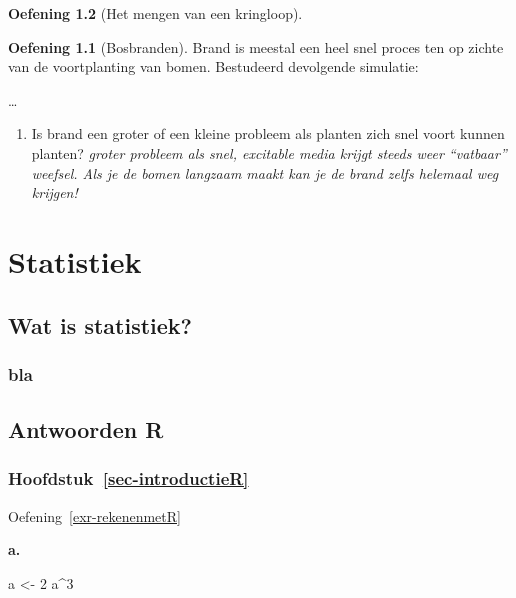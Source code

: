 \documentclass[
  a4paper,
]{scrbook}
\newenvironment{Shaded}{\begin{snugshade}}{\end{snugshade}}
\newcommand{\DecValTok}[1]{\textcolor[rgb]{0.68,0.00,0.00}{#1}}
\newcommand{\NormalTok}[1]{\textcolor[rgb]{0.00,0.23,0.31}{#1}}
\newcommand{\OtherTok}[1]{\textcolor[rgb]{0.00,0.23,0.31}{#1}}
\newcommand{\SpecialCharTok}[1]{\textcolor[rgb]{0.37,0.37,0.37}{#1}}
\providecommand{\tightlist}{%
  \setlength{\itemsep}{0pt}\setlength{\parskip}{0pt}}\usepackage{longtable,booktabs,array}
\theoremstyle{definition}
\newtheorem{exercise}{Oefening}[chapter]
\theoremstyle{remark}
\begin{document}
\begin{exercise}[Het mengen van een
kringloop]
\begin{exercise}[Bosbranden]
Brand is meestal een heel snel proces ten op zichte van de voortplanting
van bomen. Bestudeerd devolgende simulatie:

\ldots{}

\begin{enumerate}
\def\labelenumi{\alph{enumi}.}
\setcounter{enumi}{5}
\tightlist
\item
  Is brand een groter of een kleine probleem als planten zich snel voort
  kunnen planten? \emph{groter probleem als snel, excitable media krijgt
  steeds weer ``vatbaar'' weefsel. Als je de bomen langzaam maakt kan je
  de brand zelfs helemaal weg krijgen!}
\end{enumerate}

\part{Statistiek}

\chapter{Wat is statistiek?}\label{wat-is-statistiek}

\section{bla}\label{bla}

\cleardoublepage
{}
{}
\appendix

\chapter*{Antwoorden R}\label{antwoorden-r}


\section*{\texorpdfstring{Hoofdstuk~\ref{sec-introductieR}}{Hoofdstuk~}}\label{sec-introductier}


Oefening~\ref{exr-rekenenmetR}

\textbf{a. }

\begin{Shaded}
\begin{Highlighting}[]
\NormalTok{a }\OtherTok{\textless{}{-}} \DecValTok{2}
\NormalTok{a}\SpecialCharTok{\^{}}\DecValTok{3}
\end{Highlighting}
\end{Shaded}


\end{exercise}
\end{exercise}
\end{document}
